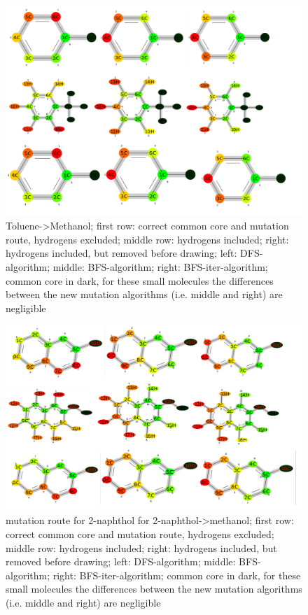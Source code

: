 \begin{figure}[H]
	
	\includegraphics[scale=0.75]{toluene_set2}\caption{Toluene->Methanol; first row: correct common core and mutation route, hydrogens excluded; middle row: hydrogens included; right: hydrogens included, but removed before drawing; left: DFS-algorithm; middle: BFS-algorithm; right: BFS-iter-algorithm; common core in dark, for these small molecules the differences between the new mutation algorithms (i.e. middle and right) are negligible}
	
\end{figure}


\begin{figure}[H]
	
	\includegraphics[scale=0.75]{2naphthol_set2}\caption{mutation route for 2-naphthol for 2-naphthol->methanol; first row: correct common core and mutation route, hydrogens excluded; middle row: hydrogens included; right: hydrogens included, but removed before drawing; left: DFS-algorithm; middle: BFS-algorithm; right: BFS-iter-algorithm; common core in dark, for these small molecules the differences between the new mutation algorithms (i.e. middle and right) are negligible}
	
\end{figure}

